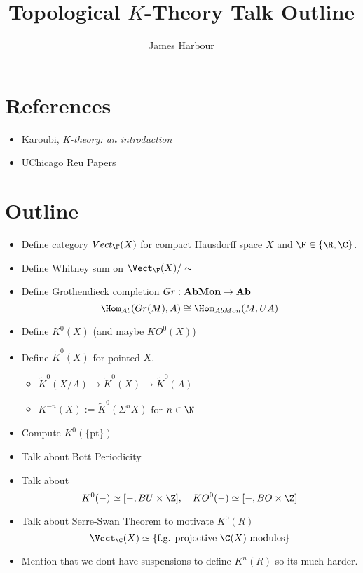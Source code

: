 \documentclass[12pt]{article}
\title{Topological $ K $-Theory Talk Outline}
\author{James Harbour}
\begin{document}
\maketitle

\section{References}
\begin{itemize}
    \item Karoubi, \textit{K-theory: an introduction}
    \item \textcolor{blue}{\href{http://math.uchicago.edu/~may/REU2021/REUPapers/Martins.pdf}{UChicago Reu Papers}}
\end{itemize}

\section{Outline}
\begin{itemize}
    \item Define category $ Vect_{\F}(X) $ for compact Hausdorff space $ X $ and $ \F\in \{\R, \C\} $. 
    \item Define Whitney sum on $ \Vect_{\F}(X)/\sim $
    \item Define Grothendieck completion $ Gr: \bold{AbMon}\to\bold{Ab} $
        \[
            \Hom_{Ab}(Gr(M), A) \cong \Hom_{AbMon}(M, UA)
        \]

    \item Define $ K^{0}(X) $ (and maybe $ KO^{0}(X) $)
    \item Define $ \widetilde{K}^{0}(X) $ for pointed $ X $.
    \begin{itemize}
        \item $ \widetilde{K}^{0}(X/A) \to \widetilde{K}^{0}(X) \to \widetilde{K}^{0}(A) $
        \item $ K^{-n}(X) := \widetilde{K}^{0}(\Sigma^{n}X) $ for $ n\in\N $
    \end{itemize}

    \item Compute $ K^{0}(\{\text{pt}\}) $
    

    \item Talk about Bott Periodicity
    \item Talk about
        \[
            K^{0}(-) \simeq [-, BU\times \Z],\quad KO^{0}(-)\simeq [-, BO\times \Z]
        \]
    \item Talk about Serre-Swan Theorem to motivate $ K^{0}(R) $
        \[
            \Vect_{\C}(X) \simeq \{\text{f.g. projective } \C(X)\text{-modules}\}
        \]
    \item Mention that we dont have suspensions to define $ K^{n}(R) $ so its much harder.
\end{itemize}
\end{document}
